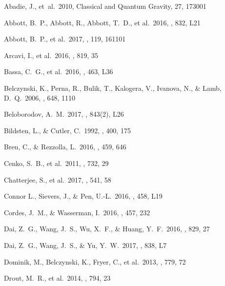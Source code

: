 \documentclass[]{pasj01}
\begin{document}
\begin{thebibliography}{10}
Abadie, J., et~al.\ 2010, Classical and Quantum Gravity, 27, 173001

{Abbott}, B.~P., {Abbott}, R., {Abbott}, T.~D., et al.\ 2016, \aplett, 832, L21

{Abbott}, B.~P., et al.\ 2017, \prl, 119, 161101


{Arcavi}, I., et al.\ 2016, \apj, 819, 35

{Bassa}, C.~G., et al.\ 2016, \mnras, 463, L36

{Belczynski}, K., {Perna}, R., {Bulik}, T., {Kalogera}, V., {Ivanova}, N., \& {Lamb}, D.~Q.\ 2006, \apj, 648, 1110

Beloborodov, A.~M.\ 2017, \apj, 843(2), L26

{Bildsten}, L., \& {Cutler}, C.\ 1992, \apj, 400, 175

{Breu}, C., \& {Rezzolla}, L.\ 2016, \mnras, 459, 646

 

{Cenko}, S.~B., et al.\ 2011, \apj, 732, 29

Chatterjee, S., et al.\ 2017, \nat, 541, 58

Connor L., {Sievers}, J., \& {Pen}, U.-L.\ 2016, \mnras, 458, L19

{Cordes}, J.~M., \& {Wasserman}, I.\ 2016, \mnras, 457, 232

{Dai}, Z.~G., {Wang}, J.~S., {Wu}, X.~F., \& {Huang}, Y.~F.\ 2016, \apj, 829, 27

{Dai}, Z.~G., {Wang}, J.~S., \& {Yu}, Y.~W.\ 2017, \aplett, 838, L7

Dominik, M., Belczynski, K., Fryer, C., et al.\ 2013, \apj, 779, 72

{Drout}, M.~R., et al.\ 2014, \apj, 794, 23


\end{thebibliography}
\end{document}
